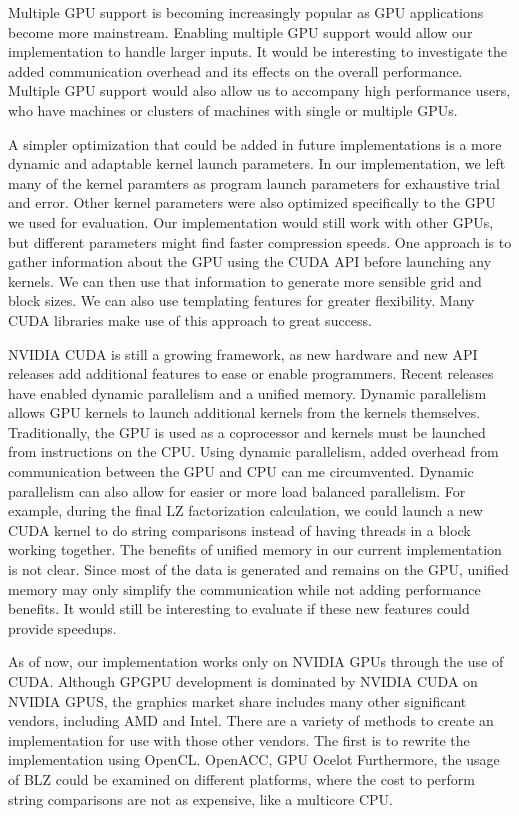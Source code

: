 Multiple GPU support is becoming increasingly popular as GPU applications become more mainstream.
Enabling multiple GPU support would allow our implementation to handle larger inputs.
It would be interesting to investigate the added communication overhead and its effects on the overall performance.
Multiple GPU support would also allow us to accompany high performance users, who have machines or clusters of machines with single or multiple GPUs.

A simpler optimization that could be added in future implementations is a more dynamic and adaptable kernel launch parameters.
In our implementation, we left many of the kernel paramters as program launch parameters for exhaustive trial and error.
Other kernel parameters were also optimized specifically to the GPU we used for evaluation.
Our implementation would still work with other GPUs, but different parameters might find faster compression speeds.
One approach is to gather information about the GPU using the CUDA API before launching any kernels.
We can then use that information to generate more sensible grid and block sizes.
We can also use templating features for greater flexibility.
Many CUDA libraries make use of this approach to great success.

NVIDIA CUDA is still a growing framework, as new hardware and new API releases add additional features to ease or enable programmers.
Recent releases have enabled dynamic parallelism and a unified memory.
Dynamic parallelism allows GPU kernels to launch additional kernels from the kernels themselves.
Traditionally, the GPU is used as a coprocessor and kernels must be launched from instructions on the CPU.
Using dynamic parallelism, added overhead from communication between the GPU and CPU can me circumvented.
Dynamic parallelism can also allow for easier or more load balanced parallelism.
For example, during the final LZ factorization calculation, we could launch a new CUDA kernel to do string comparisons instead of having threads in a block working together.
The benefits of unified memory in our current implementation is not clear.
Since most of the data is generated and remains on the GPU, unified memory may only simplify the communication while not adding performance benefits.
It would still be interesting to evaluate if these new features could provide speedups.

As of now, our implementation works only on NVIDIA GPUs through the use of CUDA.
Although GPGPU development is dominated by NVIDIA CUDA on NVIDIA GPUS, the graphics market share includes many other significant vendors, including AMD and Intel.
There are a variety of methods to create an implementation for use with those other vendors.
The first is to rewrite the implementation using OpenCL.
OpenACC, GPU Ocelot
Furthermore, the usage of BLZ could be examined on different platforms, where the cost to perform string comparisons are not as expensive, like a multicore CPU.

